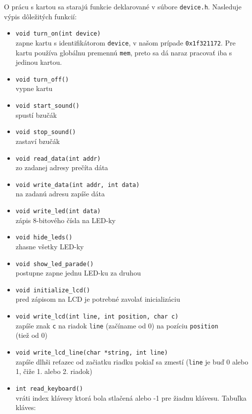 \documentclass[pdftex,12pt,a4paper]{article}
\begin{document}
O prácu s kartou sa starajú funkcie deklarované v súbore \texttt{device.h}. Nasleduje výpis dôležitých funkcií:
\begin{itemize}\itemsep5pt
	\item \texttt{void turn\_on(int device)} \\  zapne kartu s identifikátorom \texttt{device}, v našom prípade \texttt{0x1f321172}. Pre kartu používa globálnu premennú \texttt{mem}, preto sa dá naraz pracovať iba s jedinou kartou.
	\item \texttt{void turn\_off()} \\ vypne kartu
	\item \texttt{void start\_sound()} \\  spustí bzučák
	\item \texttt{void stop\_sound()} \\  zastaví bzučák
	\item \texttt{void read\_data(int addr)} \\  zo zadanej adresy prečíta dáta	
	\item \texttt{void write\_data(int addr, int data)} \\  na zadanú adresu zapíše dáta
	\item \texttt{void write\_led(int data)} \\  zápis 8-bitového čísla na LED-ky
	\item \texttt{void hide\_leds()} \\  zhasne všetky LED-ky
	\item \texttt{void show\_led\_parade()} \\  postupne zapne jednu LED-ku za druhou
	\item \texttt{void initialize\_lcd()} \\  pred zápisom na LCD je potrebné zavolať inicializáciu
	\item \texttt{void write\_lcd(int line, int position, char c)} \\  zapíše znak \texttt{c} na riadok \texttt{line} (začíname od 0) na pozíciu \texttt{position} \\  (tiež od 0)
	\item \texttt{void write\_lcd\_line(char *string, int line)} \\  zapíše dlhši reťazec od začiatku riadku pokiaľ sa zmestí (\texttt{line} je buď 0 alebo 1, čiže 1. alebo 2. riadok)
\newpage
	\item \texttt{int read\_keyboard()} \\ vráti index klávesy ktorá bola stlačená alebo -1 pre žiadnu klávesu. Tabuľka kláves: 

\end{itemize}
\end{document}
